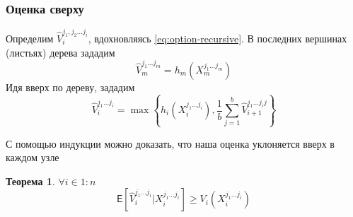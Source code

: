 \documentclass[12pt,twoside,titlepage,сa4paper]{article}
\newtheorem{theorem}{Теорема}
\begin{document}
		\subsubsection{Оценка сверху}
		\par Определим $\hat{V}_i^{j_1, j_2 \ldots j_i}$, вдохновляясь \ref{eq:option-recursive}. В последних вершинах (листьях) дерева зададим
		\begin{equation}\label{eq:upper-terminal}
			\hat{V}_m^{j_1 \ldots j_m} = h_m\left(X_m^{j_1 \ldots j_m}\right)
		\end{equation}
		Идя вверх по дереву, зададим
		\begin{equation}\label{eq:upper-node}
			\hat{V}_i^{j_1 \ldots j_i} = \max \left\lbrace h_i \left( X_i^{j_1 \ldots j_i} \right), \frac{1}{b} \sum_{j = 1}^b \hat{V}_{i+1}^{j_1 \ldots j_i j}\right\rbrace 
		\end{equation}
		\par С помощью индукции можно доказать, что наша оценка уклоняется вверх в каждом узле
		\begin{theorem}
			$\forall i \in 1:n$
			\begin{equation*}
			\mathsf{E}\left[\hat{V}_i^{j_1\ldots j_i}|X_i^{j_1\ldots j_i}\right] \geq V_i\left(X_i^{j_1\ldots j_i}\right)
			\end{equation*}
		\end{theorem}
\end{document}
